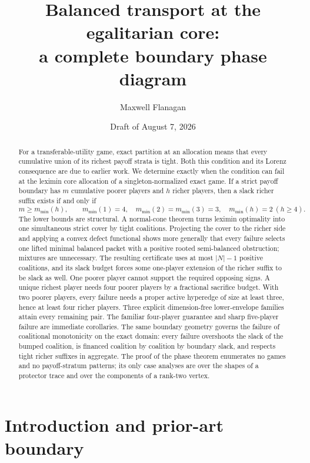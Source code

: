 \documentclass[11pt]{article}
\title{Balanced transport at the egalitarian core:\\
a complete boundary phase diagram}
\author{Maxwell Flanagan}
\date{Draft of August 7, 2026}
\begin{document}
\maketitle

\begin{abstract}
For a transferable-utility game, exact partition at an allocation means that
every cumulative union of its richest payoff strata is tight.  Both this
condition and its Lorenz consequence are due to earlier work.  We determine
exactly when the
condition can fail at the leximin core allocation of a singleton-normalized
exact game.  If a strict payoff boundary has $m$ cumulative poorer players
and $h$ richer players, then a slack richer suffix exists if and only if
\[
 m\ge m_{\min}(h),\qquad
 m_{\min}(1)=4,\quad m_{\min}(2)=m_{\min}(3)=3,
 \quad m_{\min}(h)=2\ (h\ge4).
\]
The lower bounds are structural.  A normal-cone theorem turns leximin
optimality into one simultaneous strict cover by tight coalitions.  Projecting
the cover to the richer side and applying a convex defect functional shows
more generally that every failure selects one lifted minimal balanced packet
with a positive rooted semi-balanced obstruction; mixtures are unnecessary.
The resulting certificate uses at most $|N|-1$ positive coalitions, and its
slack budget forces some one-player extension of the richer suffix to be
slack as well.
One poorer player cannot support the required opposing signs.  A unique
richest player needs four poorer players by a fractional sacrifice budget.
With two poorer players, every failure needs a proper active hyperedge of size
at least three, hence at least four richer players.  Three explicit
dimension-free lower-envelope families attain every remaining pair.  The
familiar four-player guarantee and sharp five-player failure are immediate
corollaries.  The same boundary geometry governs the failure of coalitional
monotonicity on the exact domain: every failure overshoots the slack of the
bumped coalition, is financed coalition by coalition by boundary slack, and
respects tight richer suffixes in aggregate.  The proof of the phase
theorem enumerates no games and no payoff-stratum patterns; its only case
analyses are over the shapes of a protector trace and over the components of
a rank-two vertex.
\end{abstract}

\section{Introduction and prior-art boundary}
\end{document}
